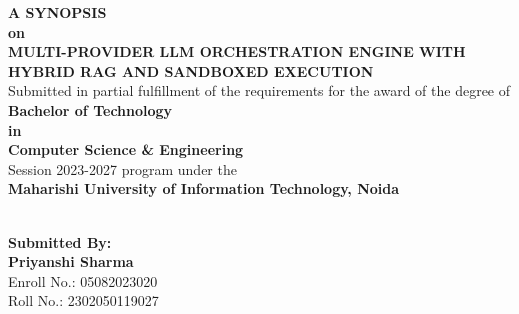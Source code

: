 \documentclass[12pt, a4paper]{report}
\begin{document}
\begin{titlepage}
    \centering
    \begin{singlespace}
        {\fontsize{18}{21.6}\selectfont \textbf{A SYNOPSIS}} \\
        \vspace{0.5cm}
        {\fontsize{14}{16.8}\selectfont \textbf{on}} \\
        \vspace{1cm}
        {\fontsize{20}{24}\selectfont \textbf{MULTI-PROVIDER LLM ORCHESTRATION ENGINE WITH HYBRID RAG AND SANDBOXED EXECUTION}} \\
        \vspace{1.5cm}
        {\fontsize{12}{14.4}\selectfont Submitted in partial fulfillment of the requirements for the award of the degree of} \\
        \vspace{0.5cm}
        {\fontsize{14}{16.8}\selectfont \textbf{Bachelor of Technology}} \\
        {\fontsize{12}{14.4}\selectfont \textbf{in}} \\
        {\fontsize{14}{16.8}\selectfont \textbf{Computer Science \& Engineering}} \\
        \vspace{0.5cm}
        {\fontsize{12}{14.4}\selectfont Session 2023-2027 program under the} \\
        \vspace{0.2cm}
        {\fontsize{14}{16.8}\selectfont \textbf{Maharishi University of Information Technology, Noida}} \\
        
        \vspace{1.5cm}
         \\
        \vspace{1.5cm}
        
        \begin{flushleft}
            \textbf{Submitted By:} \\
            \textbf{Priyanshi Sharma} \\
            Enroll No.: 05082023020 \\
            Roll No.: 2302050119027 \\
        \end{flushleft}
        

\end{singlespace}
\end{titlepage}
\end{document}
